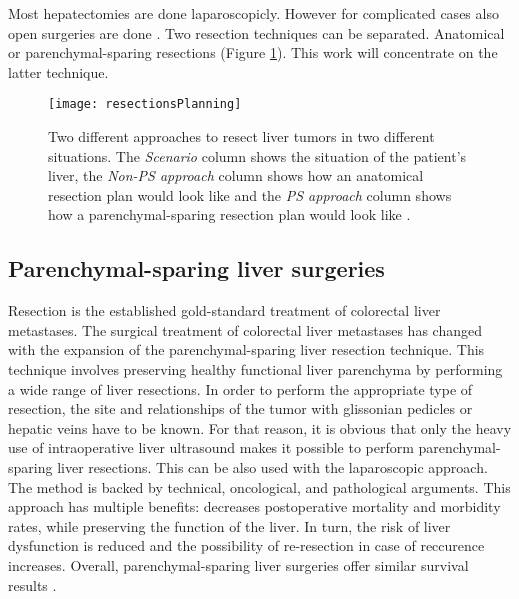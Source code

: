 Most hepatectomies are done laparoscopicly. However for complicated
cases also open surgeries are done \cite{cherqui2000laparoscopic}. Two
resection techniques can be separated. Anatomical or parenchymal-sparing
resections (Figure \ref{fig:resectionsPlanning}). This work will concentrate on the latter technique. 
\begin{figure}[H]
  \centering
 \texttt{[image: resectionsPlanning]}
  \caption{Two different approaches to resect liver tumors in two different
    situations. The \textit{Scenario} column shows the situation of the
    patient's liver, the \textit{Non-PS approach} column shows how an anatomical
  resection plan would look like and the \textit{PS approach} column shows how a
parenchymal-sparing resection plan would look like \cite{alvarez2016parenchymal}.}
  \label{fig:resectionsPlanning}
\end{figure}


\subsection{Parenchymal-sparing liver surgeries}
Resection is the established gold-standard treatment of colorectal liver
metastases. The surgical treatment of colorectal liver metastases has changed with the expansion of the
parenchymal-sparing liver resection technique. This technique involves preserving healthy
functional liver parenchyma by performing a wide range of liver resections. In
order to perform the appropriate type of resection, the site and
relationships of the tumor with glissonian pedicles or hepatic veins have to be
known.
For that reason, it is obvious that only the heavy use of intraoperative liver
ultrasound makes it possible to perform parenchymal-sparing liver resections.
This can be also used with the laparoscopic approach. The method is backed by technical, oncological,
and pathological arguments.
This approach has multiple benefits: decreases postoperative mortality and
morbidity rates, while preserving the function of the liver. In turn, the risk
of liver dysfunction is reduced and the possibility of re-resection in case of
reccurence increases. Overall, parenchymal-sparing liver surgeries offer
similar survival results \cite{Ferrero2017}.


